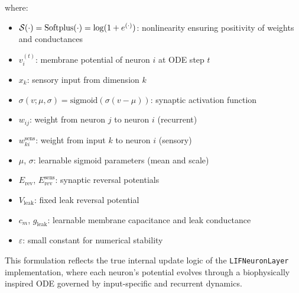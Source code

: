 \noindent where:
\begin{itemize}
    \item \( \operatorname{\mathcal{S}}(\cdot) = \text{Softplus}(\cdot) = \log(1 + e^{(\cdot)}) \): nonlinearity ensuring positivity of weights and conductances
    \item $v_i^{(t)}$: membrane potential of neuron $i$ at ODE step $t$
    \item $x_k$: sensory input from dimension $k$
    \item $\sigma(v; \mu, \sigma) = \text{sigmoid}(\sigma (v - \mu))$: synaptic activation function
    \item $w_{ij}$: weight from neuron $j$ to neuron $i$ (recurrent)
    \item $w^{\text{sens}}_{ki}$: weight from input $k$ to neuron $i$ (sensory)
    \item $\mu$, $\sigma$: learnable sigmoid parameters (mean and scale)
    \item $E_{\text{rev}}$, $E^{\text{sens}}_{\text{rev}}$: synaptic reversal potentials
    \item $V_{\text{leak}}$: fixed leak reversal potential
    \item $c_m$, $g_{\text{leak}}$: learnable membrane capacitance and leak conductance
    \item $\varepsilon$: small constant for numerical stability
\end{itemize}

\noindent This formulation reflects the true internal update logic of the \texttt{LIFNeuronLayer} implementation, where each neuron's potential evolves through a biophysically inspired ODE governed by input-specific and recurrent dynamics.

